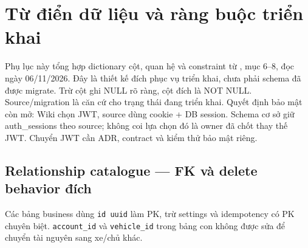 \chapter{Từ điển dữ liệu và ràng buộc triển khai}
\label{app:data-dictionary}
Phụ lục này tổng hợp dictionary cột, quan hệ và constraint từ , mục 6--8, đọc ngày 06/11/2026. Đây là thiết kế đích phục vụ triển khai, chưa phải schema đã được migrate. Trừ cột ghi NULL rõ ràng, cột đích là NOT NULL. Source/migration là căn cứ cho trạng thái đang triển khai.
Quyết định bảo mật còn mở: Wiki chọn JWT, source dùng cookie + DB session. Schema cơ sở giữ auth\_sessions theo source; không coi lựa chọn đó là owner đã chốt thay thế JWT. Chuyển JWT cần ADR, contract và kiểm thử bảo mật riêng.
\section{Relationship catalogue — FK và delete behavior đích}
Các bảng business dùng \texttt{id uuid} làm PK, trừ settings và idempotency có PK chuyên biệt. \texttt{account\_\allowbreak{}id} và \texttt{vehicle\_\allowbreak{}id} trong bảng con không được sửa để chuyển tài nguyên sang xe/chủ khác.\par
